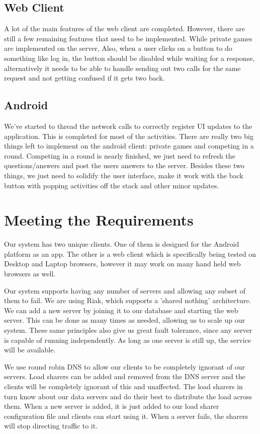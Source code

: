 \documentclass{dependencies/acm_proc_article-sp}
\begin{document}
\subsection {Web Client}
A lot of the main features of the web client are completed.
However, there are still a few remaining features that need to be implemented.
While private games are implemented on the server, 
Also, when a user clicks on a button to do something like log in, the button should be disabled while waiting for a response,
alternatively it needs to be able to handle sending out two calls for the same request and not getting confused if it gets two back.
\subsection {Android}
We've started to thread the network calls to correctly register UI updates to the application. This is completed for most of the activities. There are really two big things left to implement on the android client: private games and competing in a round. Competing in a round is nearly finished, we just need to refresh the questions/answers and post the users answers to the server. Besides these two things, we just need to solidify the user interface, make it work with the back button with popping activities off the stack and other minor updates.

\section {Meeting the Requirements}

Our system has two unique clients. One of them is designed for the Android platform as an app.
The other is a web client which is specifically being tested on Desktop and Laptop
browsers, however it may work on many hand held web browsers as well.

Our system supports having any number of servers and allowing any subset of them to fail.
We are using Riak, which supports a 'shared nothing' architecture.  We can add a new server
by joining it to our database and starting the web server.  This can be done as many times
as needed, allowing us to scale up our system.  These same principles also give us great fault
tolerance, since any server is capable of running independently.  As long as one server is still
up, the service will be available.

We use round robin DNS to allow our clients to be completely ignorant of our servers.  Load sharers
can be added and removed from the DNS server and the clients will be completely ignorant of this
and unaffected.  The load sharers in turn know about our data servers and do their best to
distribute the load across them.  When a new server is added, it is just added to our load sharer
configuration file and clients can start using it.  When a server fails, the sharers will stop directing
traffic to it.
\end{document}
